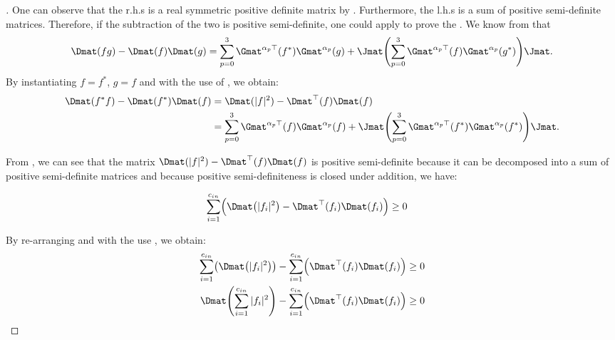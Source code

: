 \begin{proof}[]
\noindent
One can observe that the r.h.s is a real symmetric positive definite matrix by . Furthermore, the l.h.s is a sum of positive semi-definite matrices. Therefore, if the subtraction of the two is positive semi-definite, one could apply  to prove the . 
We know from  that 
\begin{equation}
    \Dmat(fg) - \Dmat(f)\Dmat(g) = \sum_{p=0}^3 \Gmat^{\alpha_p \top}(f^*) \Gmat^{\alpha_p}(g) + \Jmat \left( \sum_{p=0}^3 \Gmat^{\alpha_p \top}(f) \Gmat^{\alpha_p}(g^*) \right) \Jmat.
\end{equation}
By instantiating $f = f^*$, $g = f$ and with the use of , we obtain:
\begin{align} \label{equation:widom_identity_block_topelitz}
  \Dmat(f^* f) - \Dmat(f^*)\Dmat(f)
  &= \Dmat(|f|^2) - \Dmat^{\top}(f)\Dmat(f) \\
  &= \sum_{p=0}^3 \Gmat^{\alpha_p \top}(f)\Gmat^{\alpha_p}(f) + \Jmat \left( \sum_{p=0}^3 \Gmat^{\alpha_p \top}(f^*)\Gmat^{\alpha_p} (f^*) \right) \Jmat .
\end{align}

\noindent
From , we can see that the matrix $\Dmat(|f|^2) - \Dmat^{\top}(f)\Dmat(f)$
is positive semi-definite because it can be decomposed into a sum of positive semi-definite matrices and because positive semi-definiteness is closed under addition, we have:

\begin{align}
    \sum_{i=1}^{\cin} \leftmat \Dmat \left( |f_i|^2 \right) - \Dmat^{\top} \left(f_i \right) \Dmat (f_i) \rightmat &\geq 0
\end{align}

\noindent
By re-arranging and with the use , we obtain:
\begin{align}
   \sum_{i=1}^{\cin} \leftmat \Dmat \left( |f_i|^2 \right) \rightmat - \sum_{i=1}^{\cin} \leftmat \Dmat^{\top} \left(f_i \right) \Dmat (f_i) \rightmat &\geq 0 \\
    \Dmat \left( \sum_{i=1}^{\cin} |f_i|^2 \right) - \sum_{i=1}^{\cin} \leftmat \Dmat^{\top} \left(f_i \right) \Dmat (f_i) \rightmat &\geq 0
\end{align}


\end{proof}
